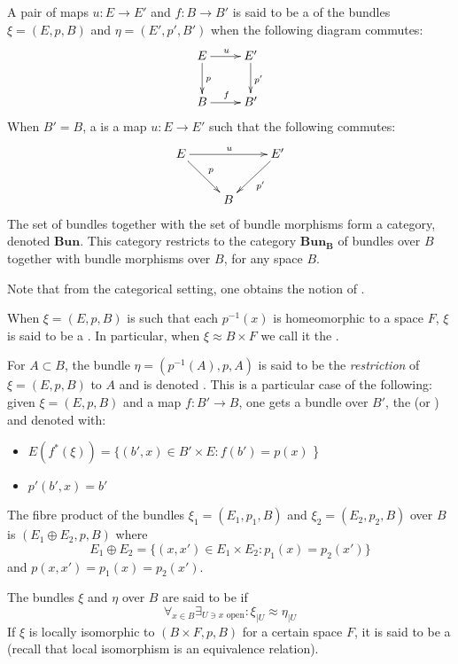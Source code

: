 \begin{definition}
 A pair of maps $u:E\rightarrow E'$ and $f:B\rightarrow B'$ is said to be a  of the bundles $\xi=(E,p,B)$ and $\eta=(E',p',B')$ when the following diagram commutes:
\[
 \xymatrix{E\ar[r]^u \ar[d]^p & E'\ar[d]^{p'}\\
B\ar[r]^f & B'}
\]
When $B'=B$, a  is a map $u:E\rightarrow E'$ such that the following commutes:
\[
 \xymatrix{E\ar[rr]^u \ar[dr]^p &  & E' \ar[dl]^{p'} \\ & B & }
\]
The set of bundles together with the set of bundle morphisms form a category, denoted $\mathbf{Bun}$. This category restricts to the category $\mathbf{Bun_B}$ of bundles over $B$ together with bundle morphisms over $B$, for any space $B$.

Note that from the categorical setting, one obtains the notion of .

When $\xi=(E,p,B)$ is such that each  $p^{-1}(x)$ is homeomorphic to a space $F$, $\xi$ is said to be a . In particular, when $\xi \approx B\times F$ we call it the .

 For $A\subset B$, the bundle $\eta=(p^{-1}(A),p,A)$ is said to be the \emph{restriction} of $\xi =(E,p,B)$ to $A$ \label{restrict} and is denoted . This is a particular case of the following: given $\xi=(E,p,B)$ and a map $f:B'\rightarrow B$, one gets a bundle over $B'$, the  (or ) and denoted  with:\begin{itemize}
     \item $E(f^*(\xi))=\{(b',x)\in B'\times E:f(b')=p(x)$ \}
    \item $p'(b',x)=b'$                                                                                                                                                                                                                                                                                                                                                                                                     \end{itemize}
The fibre product of the bundles $\xi_1=(E_1,p_1,B)$ and $\xi_2=(E_2,p_2,B)$ over $B$ is $(E_1\oplus E_2,p,B)$ where \[
                                                                                                                      E_1\oplus E_2=\{ (x,x')\in E_1\times E_2: p_1(x)=p_2(x') \}
                                                                                                                     \]
and $p(x,x')=p_1(x)=p_2(x')$.


The bundles $\xi$ and $\eta$ over $B$ are said to be  if
\[
 \forall_{x\in B} \exists_{U\ni x \text{ open}} : \xi_{|U}\approx \eta_{|U}
\]
If $\xi$ is locally isomorphic to $(B\times F,p,B)$ for a certain space $F$, it is said to be a  (recall that local isomorphism is an equivalence relation).
\end{definition}

